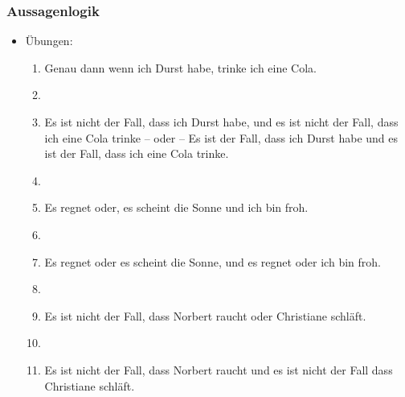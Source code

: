 \begin{frame}
\frametitle{Aussagenlogik}

\begin{itemize}
	\item Übungen:

\vspace{1em}

	\begin{enumerate}
		\item Genau dann wenn ich Durst habe, trinke ich eine Cola.
		\item[]
		\item Es ist nicht der Fall, dass ich Durst habe, und es ist nicht der Fall, dass ich eine Cola trinke -- oder -- Es ist der Fall, dass ich Durst habe und es ist der Fall, dass ich eine Cola trinke.
		\item[]
		\item Es regnet oder, es scheint die Sonne und ich bin froh.
		\item[]
		\item Es regnet oder es scheint die Sonne, und es regnet oder ich bin froh.
		\item[]
		\item Es ist nicht der Fall, dass Norbert raucht oder Christiane schläft.
		\item[]
		\item Es ist nicht der Fall, dass Norbert raucht und es ist nicht der Fall dass Christiane schläft.
	\end{enumerate}
		
\end{itemize}


\end{frame}


